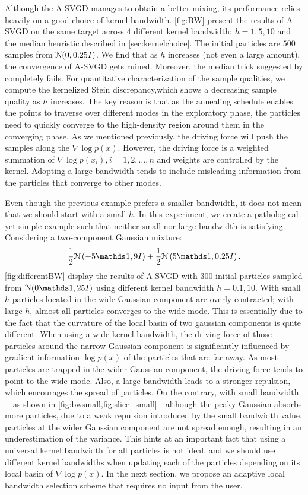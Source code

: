 Although the A-SVGD manages to obtain a better mixing, its performance relies heavily on a good choice of kernel bandwidth. \cref{fig:BW} present the results of A-SVGD on the same target across $4$ different kernel bandwidth: $h = 1, 5, 10$ and the median heuristic described in \cref{sec:kernelchoice}. The initial particles are $500$ \iid samples from $\mathcal{N}(0, 0.25I)$. We find that as $h$ increases (not even a large amount), the convergence of A-SVGD gets ruined. Moreover, the median trick suggested by \citet{liu2016stein} completely fails. For quantitative characterization of the sample qualities, we compute the kernelized Stein discrepancy,which shows a decreasing sample quality as $h$ increases. The key reason is that as the annealing schedule enables the points to traverse over different modes in the exploratory phase, the particles need to quickly converge to  the high-density region around them in the converging phase. As we mentioned previously, the driving force will push the samples along the $\nabla \log p(x)$. However, the driving force is a weighted summation of $\nabla \log p(x_i), i=1, 2, \dots, n$ and weights are controlled by the kernel. Adopting a large bandwidth tends to include misleading information from the particles that converge to other modes. 


Even though the previous example prefers a smaller bandwidth, it does not mean that we should start with a small $h$.
In this experiment, we create a pathological yet simple example such that neither small nor large bandwidth is satisfying.  
Considering a two-component Gaussian mixture:
\[
\frac{1}{2}\distNorm\left( -5 \ind, 9I \right)  + \frac{1}{2}\distNorm\left( 5\ind, 0.25I \right).
\]
\cref{fig:differentBW} display the results of A-SVGD with $300$ initial particles sampled from $\distNorm(0\ind, 25I )$ using different kernel bandwidth $h = 0.1, 10$. With small $h$ particles located in the wide Gaussian component are overly contracted; with large $h$, almost all particles converges to the wide mode.
This is essentially due to the fact that the curvature of the local basin of two gaussian components is quite different. When using a wide kernel bandwidth, the driving force of those particles around the narrow Gaussian component is significantly influenced by gradient information $\log p(x)$ of the particles that are far away. As most particles are trapped in the wider Gaussian component, the driving force tends to point to the wide mode. Also, a large bandwidth leads to a stronger repulsion, which encourages the spread of particles. On the contrary, with small bandwidth---as shown in \cref{fig:bwsmall,fig:slice_small}---although the peaky Gaussian absorbs more particles, due to a weak repulsion introduced by the small bandwidth value,  particles at the wider Gaussian component are not spread enough, resulting in an underestimation of the variance. 
This hints at an important fact that using a universal kernel bandwidth for all particles is not ideal, and we should use different kernel bandwidths when updating each of the particles depending on its local basin of $\nabla \log p(x)$. In the next section, we propose an adaptive local bandwidth selection scheme that requires no input from the user. 




